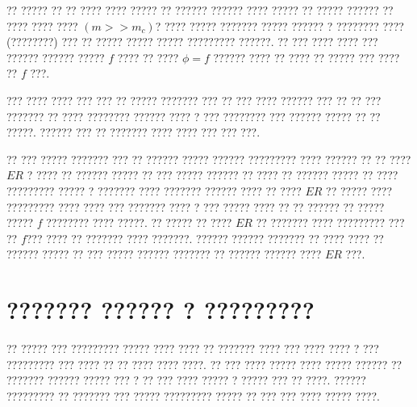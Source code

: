 \begin{aling}
\]
\end{aling}
?? ????? ?? ?? ???? ???? ????? ?? ?????? ?????? ???? ????? ??  ?????  ?????? ?? ???? ???? ???? $(m >> m_{c})$? ???? ????? ??????? ????? ?????? ? ???????? ????(????????) ??? ?? ????? ????? ????? ????????? ??????. ?? ??? ???? ???? ??? ?????? ?????? ????? $f$ ???? ?? ???? $\phi = f$  ?????? ???? ?? ???? ?? ????? ??? ???? ?? $f$ ???.

??? ???? ???? ??? ??? ?? ????? ??????? ??? ?? ??? ???? ?????? ??? ?? ?? ??? ??????? ?? ???? ???????? ?????? ???? ? ??? ???????? ??? ?????? ????? ?? ?? ?????. ?????? ??? ?? ??????? ???? ???? ??? ??? ???.

 ?? ??? ????? ??????? ??? ?? ?????? ????? ?????? ????????? ???? ?????? ?? ?? ???? $ER$ ? ???? ?? ?????? ????? ?? ??? ????? ?????? ?? ???? ?? ?????? ????? ?? ???? ????????? ????? ? ??????? ???? ??????? ?????? ???? ?? ???? $ER$ ?? ????? ???? ????????? ???? ???? ??? ??????? ???? ? ??? ????? ???? ?? ?? ?????? ?? ????? ????? $f$ ???????? ???? ?????. ?? ????? ?? ???? $ER$ ?? ??????? ???? ????????? ??? ?? $f$??? ???? ?? ??????? ???? ???????. ?????? ?????? ??????? ?? ???? ???? ?? ?????? ????? ?? ??? ????? ?????? ??????? ?? ?????? ?????? ???? $ER$ ???. 
 
  \section{??????? ?????? ? ?????????}
   ?? ????? ??? ????????? ????? ???? ???? ?? ??????? ???? ??? ???? ???? ? ??? ????????? ??? ???? ?? ?? ???? ???? ????. ?? ??? ???? ????? ???? ????? ?????? ?? ??????? ?????? ????? ??? ? ?? ??? ???? ????? ? ????? ??? ?? ????. ?????? ????????? ?? ??????? ??? ????? ????????? ????? ?? ???  ??? ???? ????? ????. 
   \newpage

